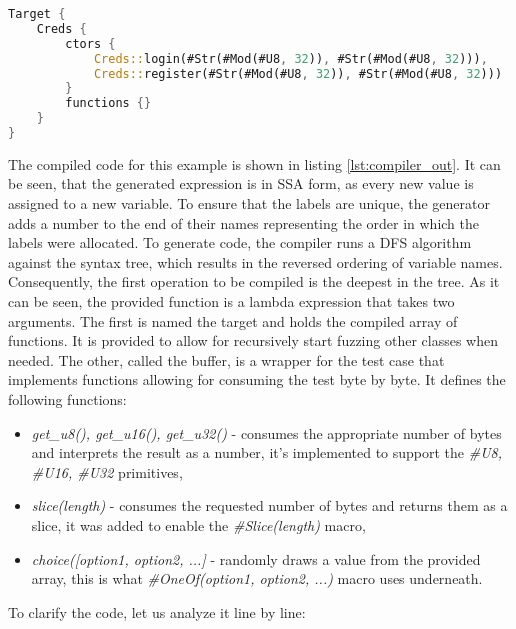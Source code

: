 \begin{minipage}{\linewidth}
\begin{lstlisting}[language=rust,caption={Creds class description.},label={lst:cred_dsc}]
Target {
    Creds {
        ctors {
            Creds::login(#Str(#Mod(#U8, 32)), #Str(#Mod(#U8, 32))),
            Creds::register(#Str(#Mod(#U8, 32)), #Str(#Mod(#U8, 32)))
        }
        functions {}
    }
}
\end{lstlisting} 
\end{minipage}

The compiled code for this example is shown in listing \ref{lst:compiler_out}. It can be seen, that the generated expression is in SSA form, as every new value is assigned to a new variable. To ensure that the labels are unique, the generator adds a number to the end of their names representing the order in which the labels were allocated. To generate code, the compiler runs a DFS algorithm against the syntax tree, which results in the reversed ordering of variable names. Consequently, the first operation to be compiled is the deepest in the tree. As it can be seen, the provided function is a lambda expression that takes two arguments. The first is named the target and holds the compiled array of functions. It is provided to allow for recursively start fuzzing other classes when needed. The other, called the buffer, is a wrapper for the test case that implements functions allowing for consuming the test byte by byte. It defines the following functions:
\begin{itemize}
    \item \textit{get\_u8(), get\_u16(), get\_u32()} - consumes the appropriate number of bytes and interprets the result as a number, it's implemented to support the \textit{\#U8, \#U16, \#U32} primitives,
    \item \textit{slice(length)} - consumes the requested number of bytes and returns them as a slice, it was added to enable the \textit{\#Slice(length)} macro,
    \item \textit{choice([option1, option2, ...]} - randomly draws a value from the provided array, this is what \textit{\#OneOf(option1, option2, ...)} macro uses underneath.
\end{itemize}
To clarify the code, let us analyze it line by line:
